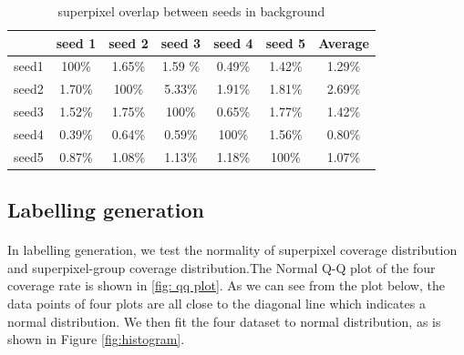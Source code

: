 \documentclass[runningheads,a4paper]{llncs}
\begin{document}
\begin{table}
\centering
\begin{tabular}{|c|c|c|c|c|c|c|}
\hline
 & seed 1 & seed 2&seed 3&seed 4&seed 5&Average\\
\hline
seed1& 100\% & 1.65\% & 1.59	\%& 0.49\%& 1.42\%& 1.29\%\\
\hline
seed2& 1.70\% & 100\% & 5.33\%& 1.91\%& 1.81\%& 2.69\% \\
\hline
seed3& 1.52\% & 1.75\% & 100\%& 0.65\%& 1.77\%& 1.42\% \\
\hline
seed4& 0.39\% & 0.64\% & 0.59\%& 100\%& 1.56\%& 0.80\%\\
\hline
seed5& 0.87\% & 1.08\% & 1.13\%& 1.18\%& 100\%& 1.07\% \\
\hline
\end{tabular}
\caption{superpixel overlap between seeds in background }
\label{ta: sp overlap b}
\end{table} 




\subsection{Labelling generation}
\paragraph{} In labelling generation, we test the normality of superpixel coverage distribution and superpixel-group coverage distribution.The Normal Q-Q plot of the four coverage rate is shown in \ref{fig: qq plot}. As we can see from the plot below, the data points of four plots are all close to the diagonal line which indicates a normal distribution. We then fit the four dataset to normal distribution, as is shown in Figure \ref{fig:histogram}.

\paragraph{}
\end{document}
